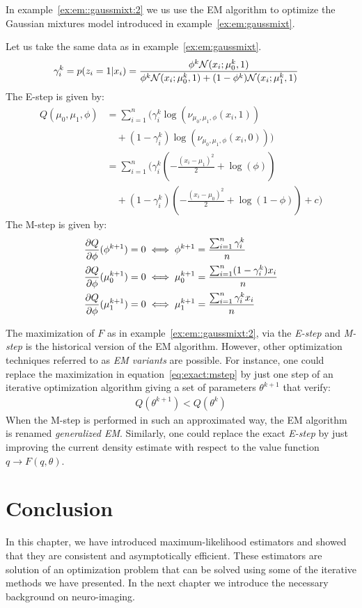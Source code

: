 In example~\ref{ex:em::gaussmixt:2} we us use the EM algorithm to optimize the Gaussian mixtures model introduced in example~\eqref{ex:em:gaussmixt}.
\begin{example}
  \label{ex:em::gaussmixt:2}
  Let us take the same data as in example~\ref{ex:em:gaussmixt}.
  \begin{align}
    \gamma_i^k = p(z_i = 1 | x_i) &= \frac{\phi^k \mathcal{N}(x_i; \mu_0^k, 1)}{ \phi^k \mathcal{N}(x_i; \mu_0^k, 1) + (1 - \phi^k) \mathcal{N}(x_i; \mu_1^k, 1)} 
  \end{align}
  The E-step is given by:
  \begin{align}
    Q(\mu_0, \mu_1, \phi) &= \sum_{i=1}^n \Big( \gamma_i^k \log(\nu_{\mu_0, \mu_1, \phi}(x_i, 1)) \\ &\enspace \enspace + (1 - \gamma_i^k) \log(\nu_{\mu_0, \mu_1, \phi}(x_i, 0)) \Big) \\
              &= \sum_{i=1}^n \Big( \gamma_i^k( -\frac{(x_i - \mu_1)^2}{2} + \log(\phi)) \\ &\enspace \enspace + (1 - \gamma_i^k) ( -\frac{(x_i - \mu_0)^2}{2} + \log(1 -\phi)) + c \Big)
 \end{align}
 The M-step is given by:
 \begin{align}
   &\frac{ \partial Q}{\partial \phi}(\phi^{k + 1}) = 0 \iff \phi^{k + 1} = \frac{\sum_{i=1}^n \gamma_i^k}{n} \\
   &\frac{ \partial Q}{\partial \phi}(\mu^{k+1}_0) = 0 \iff \mu^{k + 1}_0 = \frac{\sum_{i=1}^n (1 - \gamma_i^k) x_i}{n} \\
   &\frac{ \partial Q}{\partial \phi}(\mu^{k+1}_1) = 0 \iff \mu^{k + 1}_1 = \frac{\sum_{i=1}^n \gamma_i^k x_i}{n} \\
 \end{align}
\end{example}


The maximization of $F$ as in example~\ref{ex:em::gaussmixt:2}, via the \emph{E-step} and \emph{M-step} is the
historical version of the EM algorithm. However, other optimization techniques
referred to as \emph{EM variants}
are possible. For instance, one could replace the maximization in
equation~\eqref{eq:exact:mstep} by just one step of an iterative optimization
algorithm giving a set of parameters $\theta^{k+1}$ that verify:
\begin{align}
  Q(\theta^{k+1}) < Q(\theta^k) 
\end{align}
When the M-step is performed in such an approximated way, the EM algorithm
is renamed \emph{generalized EM}.
Similarly, one could replace the exact \emph{E-step} by just improving the
current density estimate with respect to the value function $q \rightarrow F(q,
\theta)$.

\section{Conclusion}
In this chapter, we have introduced maximum-likelihood estimators and showed
that they are consistent and asymptotically efficient. These estimators are
solution of an optimization problem that can be solved using some of the
iterative methods we have presented.
In the next chapter we introduce the necessary background on neuro-imaging.

